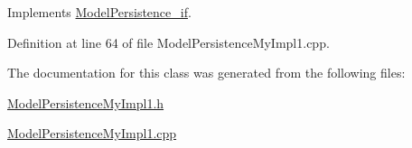 Implements \hyperlink{class_model_persistence__if_afb8e1011e873757febfb0d055d592d38}{Model\-Persistence\-\_\-if}.



Definition at line 64 of file Model\-Persistence\-My\-Impl1.\-cpp.



The documentation for this class was generated from the following files\-:\begin{DoxyCompactItemize}
\item 
\hyperlink{_model_persistence_my_impl1_8h}{Model\-Persistence\-My\-Impl1.\-h}\item 
\hyperlink{_model_persistence_my_impl1_8cpp}{Model\-Persistence\-My\-Impl1.\-cpp}\end{DoxyCompactItemize}
